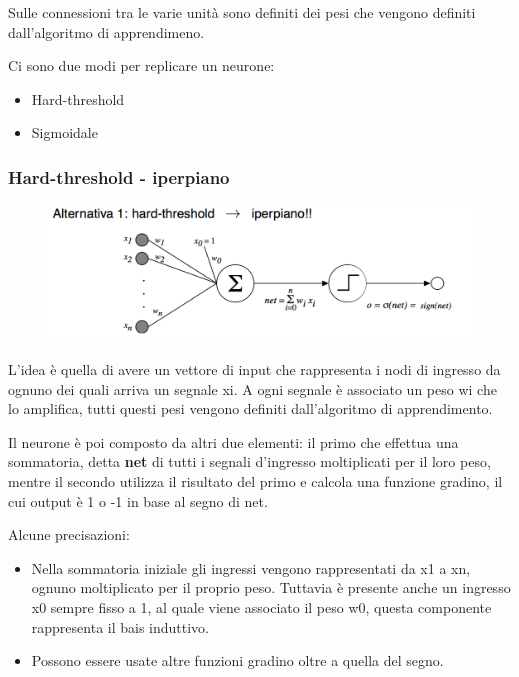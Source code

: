 Sulle connessioni tra le varie unità sono definiti dei pesi che vengono
definiti dall'algoritmo di apprendimeno.

Ci sono due modi per replicare un neurone:

\begin{itemize}

\item
  Hard-threshold
\item
  Sigmoidale
\end{itemize}

\subsubsection{Hard-threshold -
iperpiano}\label{hard-threshold---iperpiano}

\begin{figure}[htbp]
\centering
\includegraphics{./notes/immagini/l9-threshold.png}
\caption{}
\end{figure}

L'idea è quella di avere un vettore di input che rappresenta i nodi di
ingresso da ognuno dei quali arriva un segnale xi. A ogni segnale è
associato un peso wi che lo amplifica, tutti questi pesi vengono
definiti dall'algoritmo di apprendimento.

Il neurone è poi composto da altri due elementi: il primo che effettua
una sommatoria, detta \textbf{net} di tutti i segnali d'ingresso
moltiplicati per il loro peso, mentre il secondo utilizza il risultato
del primo e calcola una funzione gradino, il cui output è 1 o -1 in base
al segno di net.

Alcune precisazioni:

\begin{itemize}
\item
  Nella sommatoria iniziale gli ingressi vengono rappresentati da x1 a
  xn, ognuno moltiplicato per il proprio peso. Tuttavia è presente anche
  un ingresso x0 sempre fisso a 1, al quale viene associato il peso w0,
  questa componente rappresenta il bais induttivo.
\item
  Possono essere usate altre funzioni gradino oltre a quella del segno.
\end{itemize}

